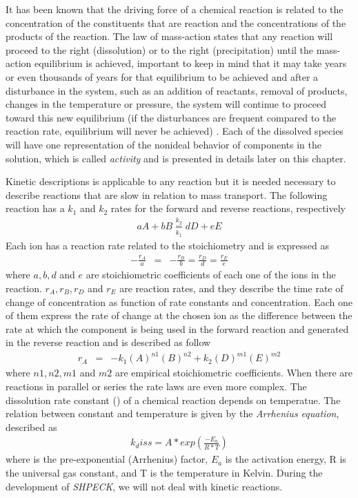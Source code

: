 \documentclass[ppgc,mestrado,english]{iiufrgs}
\begin{document}
It has been known that the driving force of a chemical reaction is related to the concentration of the constituents that are reaction and the concentrations of the products of the reaction. The law of mass-action states that any reaction will proceed to the right (dissolution) or to the right (precipitation) until the mass-action equilibrium is achieved, important to keep in mind that it may take years or even thousands of years for that equilibrium to be achieved and after a disturbance in the system, such as an addition of reactants, removal of products, changes in the temperature or pressure, the system will continue to proceed toward this new equilibrium (if the disturbances are frequent compared to the reaction rate, equilibrium will never be achieved) \cite{Freeze:79}. Each of the dissolved species will have one representation of the nonideal behavior of components in the solution, which is called \emph{activity} and is presented in details later on this chapter.

Kinetic descriptions is applicable to any reaction but it is needed necessary to describe  reactions that are slow in relation to mass transport.  The following reaction has a $k_1$ and $k_2$ rates for the forward and reverse reactions, respectively 
\begin{eqnarray}
aA + bB \underset{k_1}{\overset{k_2}{=}} dD + eE 
\end{eqnarray}
Each ion has a reaction rate related to the stoichiometry and is expressed as
\begin{eqnarray}
-\frac{r_A}{a} &=& -\frac{r_B}{b} = \frac{r_D}{d} = \frac{r_E}{e}
\end{eqnarray}
where $a, b, d$ and $e$ are stoichiometric coefficients of each one of the ions in the reaction. $r_A, r_B, r_D$ and $r_E$ are reaction rates, and they describe the time rate of change of concentration as function of rate constants and concentration. Each one of them express the rate of change at the chosen ion as the difference between the rate at which the component is being used in the forward reaction and generated in the reverse reaction and is described as follow
\begin{eqnarray}
r_A &=& - k_1 (A)^{n1}(B)^{n2} + k_2 (D)^{m1}(E)^{m2}
\end{eqnarray}
where $n1, n2, m1$ and $m2$ are empirical stoichiometric coefficients. When there are reactions in parallel or series the rate laws are even more complex.
The dissolution rate constant () of a chemical reaction depends on temperatue. The relation between constant and temperature is given by the \emph{Arrhenius equation}, described as
\begin{eqnarray}
k_diss = A * exp(\frac{-E_a}{R*T})
\end{eqnarray}
where  is the pre-exponential (Arrhenius) factor, $E_a$ is the activation energy, R is the universal gas constant, and T is the temperature in Kelvin.
During the development of \emph{SHPECK}, we will not deal with kinetic reactions.
\end{document}

